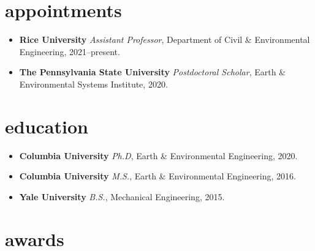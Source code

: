 \documentclass[10pt,oneside]{article}
\begin{document}

\section{appointments}

\mbox{}\vspace{-\dimexpr\baselineskip\relax}

\begin{itemize}[label={}]

  \item \textbf{Rice University}
        \textit{Assistant Professor}, Department of Civil \& Environmental Engineering, 2021--present.

  \item \textbf{The Pennsylvania State University}
        \textit{Postdoctoral Scholar}, Earth \& Environmental Systems Institute, 2020.

\end{itemize}


\section{education}

\mbox{}\vspace{-\dimexpr\baselineskip\relax}

\begin{itemize}[label={}]

  \item \textbf{Columbia University}
        \textit{Ph.D}, Earth \& Environmental Engineering, 2020.

  \item \textbf{Columbia University}
        \textit{M.S.}, Earth \& Environmental Engineering, 2016.

  \item \textbf{Yale University}
        \textit{B.S.}, Mechanical Engineering, 2015.

\end{itemize}


\section{awards}

\mbox{}\vspace{-\dimexpr\baselineskip\relax}
\end{document}
